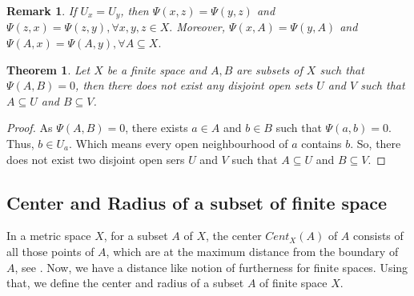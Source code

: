 \documentclass[12pt]{amsart}
\newtheorem{theorem}[definition]{Theorem}
\newtheorem{remark}[definition]{Remark}
\begin{document}
	\begin{remark}{\normalfont
			If $U_x=U_y$, %
			then $\Psi(x,z)=\Psi(y,z)$ and $\Psi(z,x)=\Psi(z,y),\forall x,y,z\in X.$ Moreover, $\Psi(x,A)=\Psi(y,A)$ and $\Psi(A,x)=\Psi(A,y),\forall A\subseteq X.$}
	\end{remark}
	
	
	\begin{theorem}
		Let $X$ be a finite space and $A, B$ are subsets of $X$ such that $\Psi(A,B)=0$, then 
		there does not exist any disjoint open sets $U$ and $V$ such that $A\subseteq U$ and $B\subseteq V$.
	\end{theorem}
	\begin{proof}
		As $\Psi(A,B)=0$, there exists $a\in A$ and $b\in B$ such that $\Psi(a,b)=0$. Thus, $b\in U_a$. Which means every open neighbourhood of $a$ contains $b$. So, there does not exist two disjoint open sers $U$ and $V$ such that $A\subseteq U$ and $B\subseteq V$.
	\end{proof}
	

	
	
	
	

	
	
	\subsection{Center and Radius of a subset of finite space} 
In a metric space $X$, for a subset $A$ of $X$, the center $Cent_{X}(A)$ of $A$ consists of all those points of $A$, which are at the maximum distance from the boundary of $A$, see \cite{Badra}. Now, we have a distance like notion of furtherness for finite spaces. Using that,  we define the center and radius of a subset $A$ of finite  space $ X$.
\end{document}
